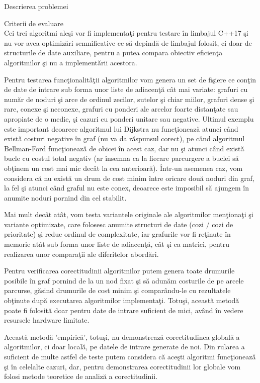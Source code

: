 \documentclass[a4paper]{article}
\begin{document}
\begin{section}{Descrierea problemei}
\begin{subsection}{Criterii de evaluare \\}
	Cei trei algoritmi ale\c si vor fi implementa\c ti pentru testare \^ in limbajul C++17 \c si nu vor avea optimiz\u ari semnificative ce s\u a depind\u a de limbajul folosit, ci doar de structurile de date auxiliare, pentru a putea compara obiectiv eficien\c ta algoritmilor \c si nu a implement\u arii acestora. \par
	Pentru testarea func\c tionalit\u a\c tii algoritmilor vom genera un set de fi\c siere ce con\c tin de date de intrare sub forma unor liste de adiacen\c t\u a c\^ at mai variate: grafuri cu num\u ar de noduri \c si arce de ordinul zecilor, sutelor \c si chiar miilor, grafuri dense \c si rare, conexe \c si neconexe, grafuri cu ponderi ale arcelor foarte distan\c tate sau apropiate de o medie, \c si cazuri cu ponderi unitare sau negative. Ultimul exemplu este important deoarece algoritmul lui Dijkstra nu func\c tioneaz\u a atunci c\^ and exist\u a costuri negative \^ in graf (nu va da r\u aspunsul corect), pe c\^ and algoritmul Bellman-Ford func\c tioneaz\u a de obicei \^ in acest caz, dar nu \c si atunci c\^ and exist\u a bucle cu costul total negativ (ar \^ insemna ca la fiecare parcurgere a buclei s\u a ob\c  tinem un cost mai mic dec\^ at la cea anterioar\u a). \^ Intr-un asemenea caz, vom considera c\u a nu exist\u a un drum de cost minim \^ intre oricare dou\u a noduri din graf, la fel \c si atunci c\^ and graful nu este conex, deoarece este imposibil s\u a ajungem \^ in anumite noduri pornind din cel stabilit.
\par
	Mai mult dec\^ at at\^ at, vom testa variantele originale ale algoritmilor men\c tiona\c ti \c si variante optimizate, care folosesc anumite structuri de date (cozi / cozi de prioritate) \c si reduc ordinul de complexitate, iar grafurile vor fi re\c tinute \^ in memorie at\^ at sub forma unor liste de adiacen\c t\u a, c\^ at \c si ca matrici, pentru realizarea unor compara\c tii ale diferitelor abord\u ari. \par
	Pentru verificarea corectitudinii algoritmilor putem genera toate drumurile posibile \^ in graf pornind de la un nod fixat \c si s\u a adun\u am costurile de pe arcele parcurse, g\u asind drumurile de cost minim \c si compar\^ andu-le cu rezultatele ob\c tinute dup\u a executarea algoritmilor implementa\c ti. Totu\c si, aceast\u a metod\u a poate fi folosit\u a doar pentru date de intrare suficient de mici, av\^ and \^ in vedere resursele hardware limitate. \par
	Aceast\u a metod\u a 'empiric\u a', totu\c si, nu demonstreaz\u a corectitudinea global\u a a algoritmilor, ci doar local\u a, pe datele de intrare generate de noi. Din rularea a suficient de multe astfel de teste putem considera c\u a ace\c sti algoritmi func\c tioneaz\u a \c si \^ in celelalte cazuri, dar, pentru demonstrarea corectitudinii lor globale vom folosi metode teoretice de analiz\u a a corectitudinii. \\[1cm]

\end{subsection}
\end{section}
\end{document}
